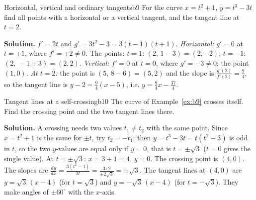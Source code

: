\documentclass[11pt]{article}
\begin{document}
\begin{exmp}{Horizontal, vertical and ordinary tangents}{b9}
For the curve $x=t^2+1$, $y=t^3-3t$ find all points with a horizontal or a vertical tangent, and the tangent line at $t=2$.

\textbf{Solution.} $f'=2t$ and $g'=3t^2-3=3(t-1)(t+1)$. \emph{Horizontal:} $g'=0$ at $t=\pm1$, where $f'=\pm2\ne0$. The points: $t=1$: $(2,\,1-3)=(2,-2)$; $t=-1$: $(2,\,-1+3)=(2,2)$. \emph{Vertical:} $f'=0$ at $t=0$, where $g'=-3\ne0$: the point $(1,0)$. \emph{At $t=2$:} the point is $(5,\,8-6)=(5,2)$ and the slope is $\frac{g'(2)}{f'(2)}=\frac{9}{4}$, so the tangent line is $y-2=\frac94(x-5)$, i.e. $y=\frac94x-\frac{37}4$.
\end{exmp}

\begin{exmp}{Tangent lines at a self-crossing}{b10}
The curve of Example~\ref{ex:b9} crosses itself. Find the crossing point and the two tangent lines there.

\textbf{Solution.} A crossing needs two values $t_1\ne t_2$ with the same point. Since $x=t^2+1$ is the same for $\pm t$, try $t_2=-t_1$: then $y=t^3-3t=t(t^2-3)$ is odd in $t$, so the two $y$-values are equal only if $y=0$, that is $t=\pm\sqrt3$ ($t=0$ gives the single value). At $t=\pm\sqrt3$: $x=3+1=4$, $y=0$. The crossing point is $(4,0)$. The slopes are $\frac{dy}{dx}=\frac{3(t^2-1)}{2t}=\frac{3\cdot2}{\pm2\sqrt3}=\pm\sqrt3$. The tangent lines at $(4,0)$ are $y=\sqrt3\,(x-4)$ (for $t=\sqrt3$) and $y=-\sqrt3\,(x-4)$ (for $t=-\sqrt3$). They make angles of $\pm60^\circ$ with the $x$-axis.
\end{exmp}
\end{document}
